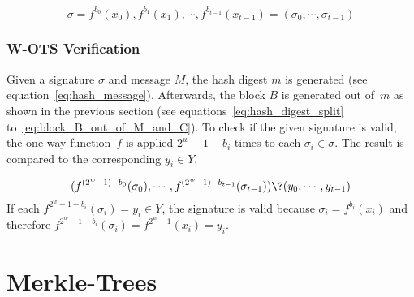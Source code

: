 \begin{equation}
\sigma = f^{b_0}(x_0), f^{b_1}(x_1), \cdots, f^{b_{t-1}}(x_{t-1}) = (\sigma_0, \cdots, \sigma_{t-1})
\end{equation}

\subsubsection{W-OTS Verification}
Given a signature $\sigma$ and message $M$, the hash digest $m$ is generated (see equation~\ref{eq:hash_message}). Afterwards, the block $B$ is generated out of~$m$ as shown in the previous section (see equations~\ref{eq:hash_digest_split} to~\ref{eq:block_B_out_of_M_and_C}). To check if the given signature is valid, the one-way function~$f$ is applied $2^w - 1 - b_i$ times to each $\sigma_i \in \sigma$. The result is compared to the corresponding $y_i \in Y$.

\begin{equation}
(f^{(2^w-1)-b_0}(\sigma_0), \cdots, f^{(2^w - 1) - b_{t-1}}(\sigma_{t-1})) \? (y_0, \cdots, y_{t-1})
\end{equation}
If each $f^{2^w-1-b_i}(\sigma_i) = y_i \in Y$, the signature is valid because $\sigma_i = f^{b_i}(x_i)$ and therefore $f^{2^w-1-b_i}(\sigma_i) = f^{2^w-1}(x_i) = y_i$.


\section{Merkle-Trees}
